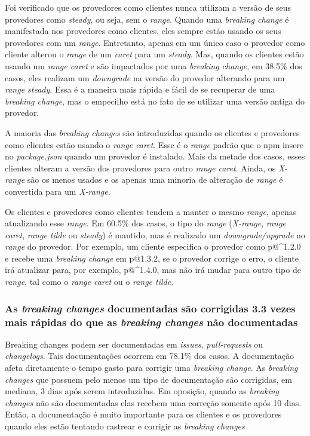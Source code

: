 Foi verificado que os provedores como clientes nunca utilizam a versão de seus provedores como \textit{steady}, ou seja, sem o \textit{range}. Quando uma \textit{breaking change} é manifestada nos provedores como clientes, eles sempre estão usando os seus provedores com um \textit{range}. Entretanto, apenas em um único caso o provedor como cliente alterou o \textit{range} de um \textit{caret} para um \textit{steady}. Mas, quando os clientes estão usando um \textit{range caret} e são impactados por uma \textit{breaking change}, em 38.5\% dos casos, eles realizam um \textit{downgrade} na versão do provedor alterando para um \textit{range steady}. Essa é a maneira mais rápida e fácil de se recuperar de uma \textit{breaking change}, mas o empecilho está no fato de se utilizar uma versão antiga do provedor.

A maioria das \textit{breaking changes} são introduzidas quando os clientes e provedores como clientes estão usando o \textit{range caret}. Esse é o \textit{range} padrão que o \textsf{npm} insere no \textit{package.json} quando um provedor é instalado. Mais da metade dos casos, esses clientes alteram a versão dos provedores para outro \textit{range caret}. Ainda, os \textit{X-range} são os menos usados e os apenas uma minoria de alteração de \textit{range} é convertida para um \textit{X-range}.

Os clientes e provedores como clientes tendem a manter o mesmo \textit{range}, apenas atualizando esse \textit{range}. Em 60.5\% dos casos, o tipo do \textit{range} (\textit{X-range}, \textit{range caret}, \textit{range tilde} ou \textit{steady}) é mantido, mas é realizado um \textit{downgrade/upgrade} no \textit{range} do provedor. Por exemplo, um cliente especifica o provedor como \textsf{p@\textasciicircum1.2.0} e recebe uma \textit{breaking change} em \textsf{p@1.3.2}, se o provedor corrige o erro, o cliente irá atualizar para, por exemplo, \textsf{p@\textasciicircum1.4.0}, mas não irá mudar para outro tipo de \textit{range}, tal como o \textit{range caret} ou o \textit{range tilde}.

\subsubsection{As \textit{breaking changes} documentadas são corrigidas 3.3 vezes mais rápidas do que as \textit{breaking changes} não documentadas}

Breaking changes podem ser documentadas em \textit{issues}, \textit{pull-requests} ou \textit{changelogs}. Tais documentações ocorrem em 78.1\% dos casos. A documentação afeta diretamente o tempo gasto para corrigir uma \textit{breaking change}. As \textit{breaking changes} que possuem pelo menos um tipo de documentação são corrigidas, em mediana, 3 dias após serem introduzidas. Em oposição, quando as \textit{breaking changes} não são documentadas elas recebem uma correção somente após 10 dias. Então, a documentação é muito importante para os clientes e os provedores quando eles estão tentando rastrear e corrigir as \textit{breaking changes}

